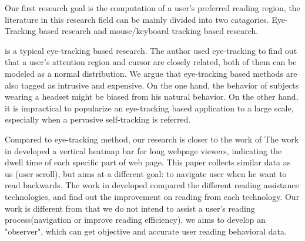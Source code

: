 \documentclass{sigchi}
\begin{document}
Our first research goal is the computation of a user's preferred reading region, the literature in this research field can be mainly divided into two catagories. Eye-Tracking based research and mouse/keyboard 
tracking based research.


\cite{nielsen2010eyetracking} is a typical eye-tracking based research. The author used eye-tracking to find out that a user's attention region and cursor are closely related, 
both of them can be modeled as a normal distribution.  We argue that eye-tracking based methods are also tagged as intrusive and expensive. On the one hand,
the behavior of subjects wearing a headset might be biased from his natural behavior. On the other hand,  it is impractical to popularize an eye-tracking based application to a large scale,
especially when a pervasive self-tracking is referred. 

Compared to eye-tracking method, our research is closer to the work of \cite{navalpakkam2012mouse,huang2011no,lagun2011viewser,atterer2007tracking,hornbaek2003reading,atterer2008heatmap}
The work in \cite{atterer2008heatmap} developed a vertical heatmap bar for long webpage viewers, indicating the dwell time of each specific part of web page.
 This paper collects similar data as us (user scroll), but aims at a different goal: to navigate user when he want to read backwards. 
The work in \cite{hornbaek2003reading} developed compared the different reading assistance technologies, and find out the improvement on reading from each technology.
Our work is different from \cite{atterer2008heatmap,hornbaek2003reading} that we do not intend to assist a user's reading process(navigation or improve reading efficiency),
 we aims to develop an "observer", which can get objective and accurate user reading behavioral data. 
\end{document}

